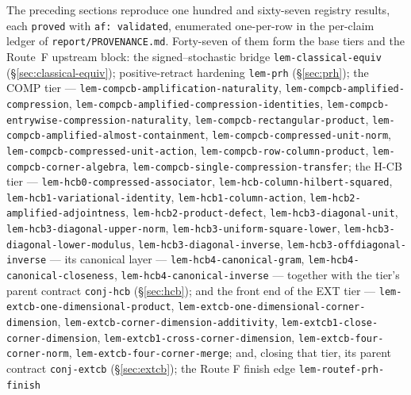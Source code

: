 The preceding sections reproduce one hundred and sixty-seven registry results, each
\texttt{proved} with \texttt{af: validated}, enumerated one-per-row in the per-claim
ledger of \texttt{report/PROVENANCE.md}. Forty-seven of them form the base tiers and
the Route~F upstream block: the signed--stochastic bridge
\texttt{lem-classical-equiv} (\S\ref{sec:classical-equiv});
positive-retract hardening \texttt{lem-prh} (\S\ref{sec:prh}); the COMP tier ---
\texttt{lem-compcb-amplification-naturality},
\texttt{lem-compcb-amplified-compression},
\texttt{lem-compcb-amplified-compression-identities},
\texttt{lem-compcb-entrywise-compression-naturality},
\texttt{lem-compcb-rectangular-product},
\texttt{lem-compcb-amplified-almost-containment},
\texttt{lem-compcb-compressed-unit-norm},
\texttt{lem-compcb-compressed-unit-action},
\texttt{lem-compcb-row-column-product},
\texttt{lem-compcb-corner-algebra},
\texttt{lem-compcb-single-compression-transfer};
the H-CB tier ---
\texttt{lem-hcb0-compressed-associator},
\texttt{lem-hcb-column-hilbert-squared},
\texttt{lem-hcb1-variational-identity},
\texttt{lem-hcb1-column-action},
\texttt{lem-hcb2-amplified-adjointness},
\texttt{lem-hcb2-product-defect},
\texttt{lem-hcb3-diagonal-unit},
\texttt{lem-hcb3-diagonal-upper-norm},
\texttt{lem-hcb3-uniform-square-lower},
\texttt{lem-hcb3-diagonal-lower-modulus},
\texttt{lem-hcb3-diagonal-inverse},
\texttt{lem-hcb3-offdiagonal-inverse} ---
its canonical layer ---
\texttt{lem-hcb4-canonical-gram},
\texttt{lem-hcb4-canonical-closeness},
\texttt{lem-hcb4-canonical-inverse} ---
together with the tier's parent contract \texttt{conj-hcb} (\S\ref{sec:hcb}); and the
front end of the EXT tier ---
\texttt{lem-extcb-one-dimensional-product},
\texttt{lem-extcb-one-dimensional-corner-dimension},
\texttt{lem-extcb-corner-dimension-additivity},
\texttt{lem-extcb1-close-corner-dimension},
\texttt{lem-extcb1-cross-corner-dimension},
\texttt{lem-extcb-four-corner-norm},
\texttt{lem-extcb-four-corner-merge};
and, closing that tier, its parent contract \texttt{conj-extcb} (\S\ref{sec:extcb});
the Route F finish edge \texttt{lem-routef-prh-finish}
